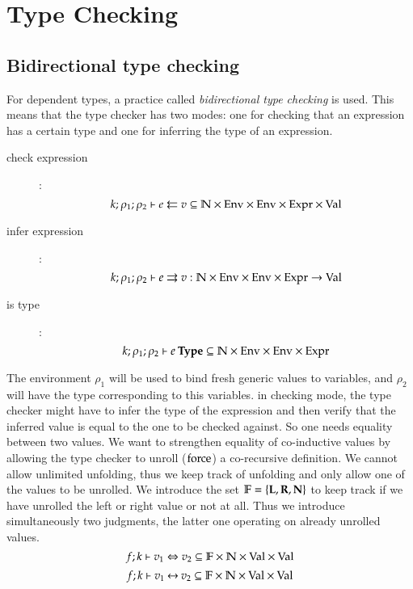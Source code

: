 \section{Type Checking}

\renewcommand\Check[5]{#1;#2;#3\vdash#4\leftleftarrows#5}
\newcommand\IsType[4]{#1;#2;#3\vdash#4\:\mathbf{Type}}
\newcommand\DataType[5]{#1;#2;#3;#4\vdash#5\:\mathbf{Data Type}}
\newcommand\ConType[5]{#1;#2;#3;#4\vdash#5\:\mathbf{Con Type}}
\newcommand\Infer[5]{#1;#2;#3\vdash#4\rightrightarrows#5}
\newcommand\EqVal[4]{#1;#2\vdash#3\Leftrightarrow#4}
\newcommand\FeqVal[4]{#1;#2\vdash#3{\:\leftrightarrow\:}#4}
\newcommand\DeqVal[2]{\vdash#1\leftrightarrow#2}
\newcommand\LeqVal[4]{#1;#2;\vdash#3\leq#4}
\newcommand\FleqVal[4]{#1;#2\vdash#3{\:\ll\:}#4}
\newcommand\DLeqVal[2]{\vdash#1\leq#2}
\newcommand\SzLeq[2]{\vdash#1\sqsubseteq#2}

\subsection{Bidirectional type checking} 
For dependent types, a practice called \emph{bidirectional type checking} is used.
This means that the type checker has two modes:
one for checking that an expression has a certain type and one for inferring the type of an expression.

\begin{description}
\item[check expression]:
\[\Check{k}{\rho_1}{\rho_2}{e}{v} \subseteq \cN \times \Env \times \Env \times \Expr \times \Val\]
\item[infer expression]:
\[\Infer{k}{\rho_1}{\rho_2}{e}{v} : \cN \times \Env \times \Env \times \Expr \ra \Val\]
\item[is type]:
\[\IsType{k}{\rho_1}{\rho_2}{e} \subseteq \cN \times \Env \times \Env \times \Expr \]
\end{description}

The environment $\rho_1$ will be used to bind fresh generic values to variables, and $\rho_2$ will have the type corresponding to this variables. in checking mode, the type checker might have to infer the type of the expression and then verify that the inferred value is equal to the one to be checked against.
So one needs equality between two values.
We want to strengthen equality of co-inductive values by allowing the type checker to unroll ($\mathrm{force}$) a co-recursive definition. We cannot allow unlimited unfolding, thus we keep track of unfolding and only allow one of the values to be unrolled.
We introduce the set $ \mathbb{F} = \{\mathbf{L}, \mathbf{R}, \mathbf{N} \} $ to keep track if we have unrolled the left or right value or not at all.
Thus we introduce simultaneously two judgments, the latter one operating on already unrolled values.
\[\EqVal{f}{k}{v_1}{v_2} \subseteq \cF \times \cN \times \Val \times \Val \]
\[\FeqVal{f}{k}{v_1}{v_2} \subseteq \cF \times \cN \times\Val \times \Val \]

